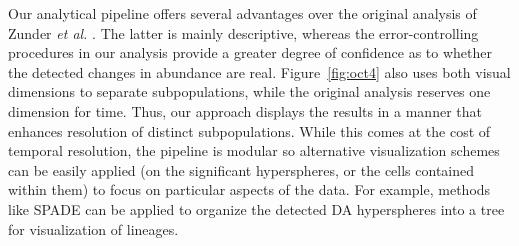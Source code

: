 \documentclass{article}
\begin{document}


Our analytical pipeline offers several advantages over the original analysis of Zunder \emph{et al.} \cite{zunder2015continuous}.
The latter is mainly descriptive, whereas the error-controlling procedures in our analysis provide a greater degree of confidence as to whether the detected changes in abundance are real.
Figure~\ref{fig:oct4} also uses both visual dimensions to separate subpopulations, while the original analysis reserves one dimension for time.
Thus, our approach displays the results in a manner that enhances resolution of distinct subpopulations.
While this comes at the cost of temporal resolution, the pipeline is modular so alternative visualization schemes can be easily applied (on the significant hyperspheres, or the cells contained within them) to focus on particular aspects of the data.
For example, methods like SPADE can be applied to organize the detected DA hyperspheres into a tree for visualization of lineages.
\end{document}

